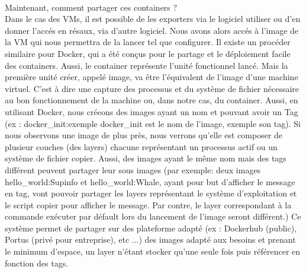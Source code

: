 \documentclass[a4paper,11pt]{article}
\begin{document}
\paragraph*{}
Maintenant, comment partager ces containers ? \\ Dans le cas des VMs, il est possible de les exporters via le logiciel utiliser ou d'en donner l'accés en résaux, via d'autre logiciel. Nous avons alors accés à l'image de la VM qui nous permettra de la lancer tel que configurer. Il existe un procéder similaire pour Docker, qui a été conçus pour le partage et le déploiement facile des containers. Aussi, le container représente l'unité fonctionnel lancé. Mais la première unité créer, appelé image, va être l'équivalent de l'image d'une machine virtuel. C'est à dire une capture des processus et du système de fichier nécessaire au bon fonctionnement de la machine ou, dans notre cas, du container. 
Aussi, en utilisant Docker, nous créeons des images ayant un nom et pouvant avoir un Tag (ex : docker\_init:exemple docker\_init est le nom de l'image, exemple son tag). Si nous observons une image de plus près, nous verrons qu'elle est composer de plusieur couches (des layers) chacune représentant un processus actif ou un système de fichier copier. Aussi, des images ayant le même nom mais des tags différent peuvent partager leur sous images (par exemple: deux images hello\_world:Supinfo et hello\_world:Whale, ayant pour but d'afficher le message en tag, vont pouvoir partager les layers représentant le système d'exploitation et le script copier pour afficher le message. Par contre, le layer correspondant à la commande exécuter par défault lors du lancement de l'image seront différent.) Ce système permet de partager sur des plateforme adapté (ex : Dockerhub (public), Portus (privé pour entreprise), etc ...) des images adapté aux besoins et prenant le minimum d'espace, un layer n'étant stocker qu'une seule fois puis référencer en fonction des tags.
\end{document}
